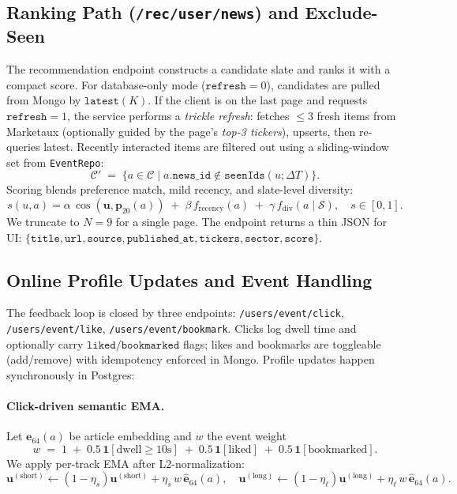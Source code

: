 \subsection{Ranking Path (\texttt{/rec/user/news}) and Exclude-Seen}

The recommendation endpoint constructs a candidate slate and ranks it with a compact score. For database-only mode (\(\texttt{refresh}=0\)), candidates are pulled from Mongo by \(\texttt{latest}(K)\). If the client is on the last page and requests \(\texttt{refresh}=1\), the service performs a \emph{trickle refresh}: fetches \(\le 3\) fresh items from Marketaux (optionally guided by the page’s \emph{top-3 tickers}), upserts, then re-queries latest. Recently interacted items are filtered out using a sliding-window set from \texttt{EventRepo}:
\[
\mathcal{C}' \;=\; \{a\in\mathcal{C}\mid a.\texttt{news\_id}\notin \texttt{seenIds}(u;\Delta T)\}.
\]
Scoring blends preference match, mild recency, and slate-level diversity:
\[
s(u,a)=\alpha\,\cos(\mathbf{u},\mathbf{p}_{20}(a))\;+\;\beta\,f_{\text{recency}}(a)\;+\;\gamma\,f_{\text{div}}(a\mid\mathcal{S}),
\quad s\in[0,1].
\]
We truncate to \(N=9\) for a single page. The endpoint returns a thin JSON for UI: \(\{\texttt{title},\texttt{url},\texttt{source},\texttt{published\_at},\texttt{tickers},\texttt{sector},\texttt{score}\}\).

\subsection{Online Profile Updates and Event Handling}

The feedback loop is closed by three endpoints: \texttt{/users/event/click}, \texttt{/users/event/like}, \texttt{/users/event/bookmark}. Clicks log dwell time and optionally carry \(\texttt{liked}/\texttt{bookmarked}\) flags; likes and bookmarks are toggleable (add/remove) with idempotency enforced in Mongo. Profile updates happen synchronously in Postgres:

\paragraph{Click-driven semantic EMA.}
Let \(\mathbf{e}_{64}(a)\) be article embedding and \(w\) the event weight
\[
w \;=\; 1 \;+\; 0.5\,\mathbf{1}[\text{dwell}\ge 10\text{s}] \;+\; 0.5\,\mathbf{1}[\text{liked}] \;+\; 0.5\,\mathbf{1}[\text{bookmarked}].
\]
We apply per-track EMA after L2-normalization:
\[
\mathbf{u}^{(\text{short})}\!\leftarrow (1-\eta_s)\mathbf{u}^{(\text{short})} + \eta_s\,w\,\widehat{\mathbf{e}}_{64}(a),\quad
\mathbf{u}^{(\text{long})}\!\leftarrow (1-\eta_\ell)\mathbf{u}^{(\text{long})} + \eta_\ell\,w\,\widehat{\mathbf{e}}_{64}(a).
\]

